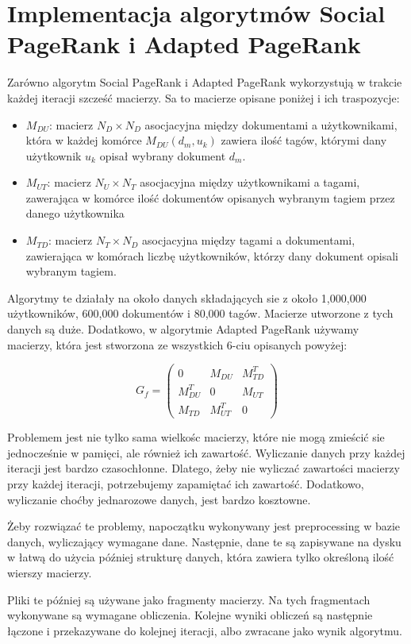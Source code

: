 \section{Implementacja algorytmów Social PageRank i Adapted PageRank}

Zarówno algorytm Social PageRank i Adapted PageRank wykorzystują w trakcie każdej iteracji szcześć macierzy. Sa to macierze opisane poniżej i ich traspozycje:

\begin{itemize}
\item $M_{DU}$: macierz $N_D \times N_D$ asocjacyjna między dokumentami a użytkownikami, która w każdej komórce $M_{DU}(d_m, u_k)$ zawiera ilość tagów, którymi dany użytkownik $u_k$ opisał wybrany dokument $d_m$.
\item $M_{UT}$: macierz $N_U \times N_T$  asocjacyjna między użytkownikami a tagami, zawerająca w komórce ilość dokumentów opisanych wybranym tagiem przez danego użytkownika
\item $M_{TD}$: macierz $N_T \times N_D$ asocjacyjna między tagami a dokumentami, zawierająca w komórach liczbę użytkowników, którzy dany dokument opisali wybranym tagiem.

\end{itemize}

Algorytmy te działały na około danych składających sie z około 1,000,000 użytkowników, 600,000 dokumentów i 80,000 tagów. Macierze utworzone z tych danych są duże. Dodatkowo, w algorytmie Adapted PageRank używamy macierzy, która jest stworzona ze wszystkich 6-ciu opisanych powyżej:

\[
 G_f =
 \begin{pmatrix}
  0                     & M_{DU}       & M_{TD}^T \\
  M_{DU}^T  & 0                     & M_{UT}     \\
  M_{TD}       & M_{UT}^T   & 0 
 \end{pmatrix}
\]

Problemem jest nie tylko sama wielkośc macierzy, które nie mogą zmieścić sie jednocześnie w pamięci, ale również ich zawartość. Wyliczanie danych przy każdej iteracji jest bardzo czasochłonne. Dlatego, żeby nie wyliczać zawartości macierzy przy każdej iteracji, potrzebujemy zapamiętać ich zawartość. Dodatkowo, wyliczanie choćby jednarozowe danych, jest bardzo kosztowne.

Żeby rozwiązać te problemy, napoczątku wykonywany jest preprocessing w bazie danych, wyliczający wymagane dane. Następnie, dane te są zapisywane na dysku w łatwą do użycia później strukturę danych, która zawiera tylko określoną ilość wierszy macierzy.


Pliki te później są używane jako fragmenty macierzy. Na tych fragmentach wykonywane są wymagane obliczenia. Kolejne wyniki obliczeń są następnie łączone i przekazywane do kolejnej iteracji, albo zwracane jako wynik algorytmu.


